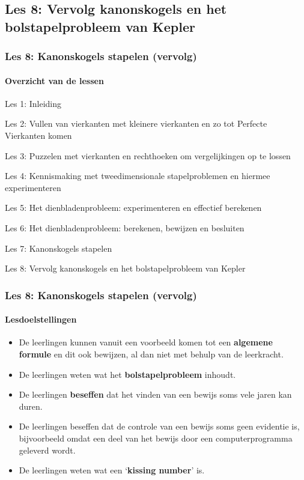 \documentclass[dutch]{beamer}
\begin{document}
\subsection{Les 8: Vervolg kanonskogels en het bolstapelprobleem van Kepler}
\begin{frame}
\frametitle{Les 8: Kanonskogels stapelen {\small (vervolg)}}
\framesubtitle{Overzicht van de lessen}
\begin{list}{\quad}{}
\item Les 1: Inleiding
\item Les 2: Vullen van vierkanten met kleinere vierkanten en zo tot Perfecte Vierkanten komen
\item Les 3: Puzzelen met vierkanten en rechthoeken om vergelijkingen op te lossen
\item Les 4: Kennismaking met tweedimensionale stapelproblemen en hiermee experimenteren
\item Les 5: Het dienbladenprobleem: experimenteren en effectief berekenen
\item Les 6: Het dienbladenprobleem: berekenen, bewijzen en besluiten
\item Les 7: Kanonskogels stapelen
\item {\color{blue}Les 8: Vervolg kanonskogels en het bolstapelprobleem van Kepler}
\end{list}
\end{frame}

\begin{frame}
\frametitle{Les 8: Kanonskogels stapelen {\small (vervolg)}}
\framesubtitle{Lesdoelstellingen}
\begin{itemize}
\item De leerlingen kunnen vanuit een voorbeeld komen tot een \textbf{algemene formule} en dit ook bewijzen, al dan niet met behulp van de leerkracht.
\item De leerlingen weten wat het \textbf{bolstapelprobleem} inhoudt.
\item De leerlingen \textbf{beseffen} dat het vinden van een bewijs soms vele jaren kan duren.
\item De leerlingen beseffen dat de controle van een bewijs soms geen evidentie is, bijvoorbeeld omdat een deel van het bewijs door een computerprogramma geleverd wordt.
\item De leerlingen weten wat een \textquoteleft \textbf{kissing number}' is.
\end{itemize}
\end{frame}
\end{document}
